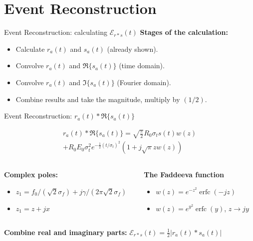 \documentclass{beamer}
\DeclareMathOperator\erfc{erfc}
\begin{document}
\section{Event Reconstruction}

\begin{frame}[fragile]{Event Reconstruction: calculating $\mathcal{E}_{r * s}(t)$}
\textbf{\alert{Stages of the calculation:}}
\begin{itemize}
\item Calculate $r_a(t)$ and $s_a(t)$ (already shown).
\item Convolve $r_a(t)$ and $\Re\lbrace s_a(t)\rbrace$ (time domain).
\item Convolve $r_a(t)$ and $\Im\lbrace s_a(t)\rbrace$ (Fourier domain).
\item Combine results and take the magnitude, multiply by $(1/2)$.
\end{itemize}
\end{frame}

\begin{frame}[fragile]{Event Reconstruction: $r_a(t) * \Re\lbrace s_a(t)\rbrace$}
\begin{tcolorbox}[colback=box_background,colframe=box_frame,title={Result for $r_a(t) * \Re\lbrace s_a(t)\rbrace$}]
\begin{multline}
r_a(t) * \Re\lbrace s_a(t) \rbrace = \sqrt{\frac{\pi}{2}}R_0 \sigma_t s(t) w(z) \\
+ R_0 E_0 \sigma_t^2 e^{-\frac{1}{2}(t/\sigma_t)^2}(1+j\sqrt{\pi} z w(z)) \label{eq:Re_result}
\end{multline}
\end{tcolorbox}
\small
\begin{columns}[T]
\begin{column}{0.49\textwidth}
\textbf{Complex poles:}
\begin{itemize}
\item $z_1 = f_0/(\sqrt{2}\sigma_f) + j\gamma/(2\pi \sqrt{2} \sigma_f)$
\item $z_1 = z + jx$
\end{itemize}
\end{column}
\begin{column}{0.49\textwidth}
\textbf{The Faddeeva function}
\begin{itemize}
\item $w(z) = e^{-z^2}\erfc(-jz)$
\item $w(z) = e^{y^2}\erfc(y)$, $z\to jy$
\end{itemize}
\end{column}
\end{columns} \vspace{0.25cm}
\normalsize
\textbf{\alert{Combine real and imaginary parts:}} $\mathcal{E}_{r * s}(t) = \frac{1}{2}|r_a(t) * s_a(t)|$
\end{frame}
\end{document}
